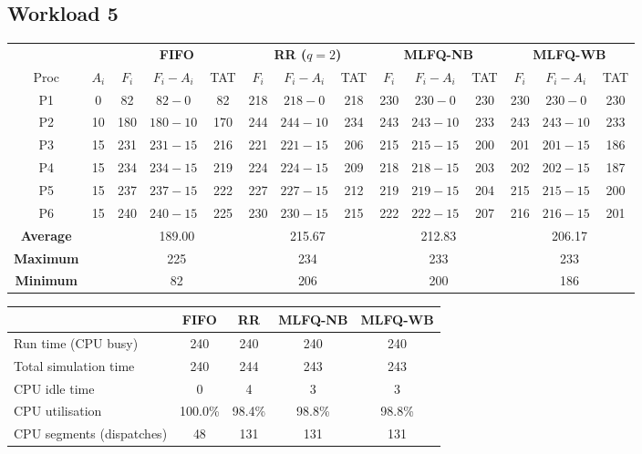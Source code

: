 \documentclass[11pt,a4paper]{article}
\begin{document}
\subsection{Workload 5}
\begin{center}\footnotesize\setlength{\tabcolsep}{4pt}
\begin{tabular}{cccccccccccccc}\toprule
& & \multicolumn{3}{c}{\textbf{FIFO}} & \multicolumn{3}{c}{\textbf{RR ($q=2$)}} & \multicolumn{3}{c}{\textbf{MLFQ-NB}} & \multicolumn{3}{c}{\textbf{MLFQ-WB}} \\
\cmidrule(lr){3-5}\cmidrule(lr){6-8}\cmidrule(lr){9-11}\cmidrule(lr){12-14}
Proc & $A_i$ & $F_i$ & $F_i-A_i$ & TAT & $F_i$ & $F_i-A_i$ & TAT & $F_i$ & $F_i-A_i$ & TAT & $F_i$ & $F_i-A_i$ & TAT \\\midrule
P1 & 0 & 82 & $82-0$ & 82 & 218 & $218-0$ & 218 & 230 & $230-0$ & 230 & 230 & $230-0$ & 230 \\
P2 & 10 & 180 & $180-10$ & 170 & 244 & $244-10$ & 234 & 243 & $243-10$ & 233 & 243 & $243-10$ & 233 \\
P3 & 15 & 231 & $231-15$ & 216 & 221 & $221-15$ & 206 & 215 & $215-15$ & 200 & 201 & $201-15$ & 186 \\
P4 & 15 & 234 & $234-15$ & 219 & 224 & $224-15$ & 209 & 218 & $218-15$ & 203 & 202 & $202-15$ & 187 \\
P5 & 15 & 237 & $237-15$ & 222 & 227 & $227-15$ & 212 & 219 & $219-15$ & 204 & 215 & $215-15$ & 200 \\
P6 & 15 & 240 & $240-15$ & 225 & 230 & $230-15$ & 215 & 222 & $222-15$ & 207 & 216 & $216-15$ & 201 \\
\midrule
\textbf{Average} & & \multicolumn{3}{c}{189.00} & \multicolumn{3}{c}{215.67} & \multicolumn{3}{c}{212.83} & \multicolumn{3}{c}{206.17} \\
\textbf{Maximum} & & \multicolumn{3}{c}{225} & \multicolumn{3}{c}{234} & \multicolumn{3}{c}{233} & \multicolumn{3}{c}{233} \\
\textbf{Minimum} & & \multicolumn{3}{c}{82} & \multicolumn{3}{c}{206} & \multicolumn{3}{c}{200} & \multicolumn{3}{c}{186} \\
\bottomrule\end{tabular}\end{center}
\begin{center}\footnotesize\begin{tabular}{lcccc}\toprule
& \textbf{FIFO} & \textbf{RR} & \textbf{MLFQ-NB} & \textbf{MLFQ-WB}\\\midrule
Run time (CPU busy) & 240 & 240 & 240 & 240 \\
Total simulation time & 240 & 244 & 243 & 243 \\
CPU idle time & 0 & 4 & 3 & 3 \\
CPU utilisation & 100.0\% & 98.4\% & 98.8\% & 98.8\% \\
CPU segments (dispatches) & 48 & 131 & 131 & 131 \\
\bottomrule\end{tabular}\end{center}
\end{document}
